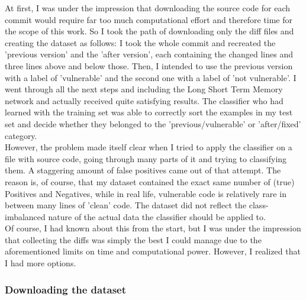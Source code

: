 \documentclass[
	a4paper,
	pagesize,
	pdftex,
	12pt,
	twoside, %
	BCOR=5mm, %
	ngerman,
	fleqn,
	final,
	]{scrartcl}
\begin{document}
At first, I was under the impression that downloading the source code for each commit would require far too much computational effort and therefore time for the scope of this work. So I took the path of downloading only the diff files and creating the dataset as follows: I took the whole commit and recreated the 'previous version' and the 'after version', each containing the changed lines and three lines above and below those. Then, I intended to use the previous version with a label of 'vulnerable' and the second one with a label of 'not vulnerable'. I went through all the next steps and including the Long Short Term Memory network and actually received quite satisfying results. The classifier who had learned with the training set was able to correctly sort the examples in my test set and decide whether they belonged to the 'previous/vulnerable' or 'after/fixed' category.\\
However, the problem made itself clear when I tried to apply the classifier on a file with source code, going through many parts of it and trying to classifying them. A staggering amount of false positives came out of that attempt. The reason is, of course, that my dataset contained the exact same number of (true) Positives and Negatives, while in real life, vulnerable code is relatively rare in between many lines of 'clean' code. The dataset did not reflect the class-imbalanced nature of the actual data the classifier should be applied to.\\
Of course, I had known about this from the start, but I was under the impression that collecting the diffs was simply the best I could manage due to the aforementioned limits on time and computational power. However, I realized that I had more options.


\subsubsection{Downloading the dataset}
\end{document}
